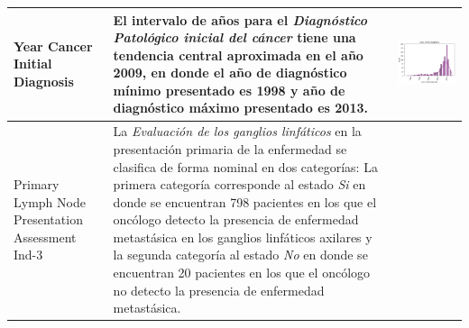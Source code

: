 \begin{table}[!htb]
	\footnotesize
	\begin{threeparttable}
		\begin{tabular}{p{2.5cm} p{7cm} p{6.5cm}} \toprule
		
			Year Cancer Initial Diagnosis
			& El intervalo de años para el \textit{Diagnóstico Patológico inicial del cáncer} tiene una tendencia central aproximada en el año 2009, en donde el año de diagnóstico mínimo presentado es 1998 y año de diagnóstico máximo presentado es 2013.
			
			& \begin{center}\includegraphics[width=1\linewidth]{NOTEBOOK/IMAGENES_DESCRIPTIVAS/21_year_initial_diagnosis}\end{center}
			\\ \hline
			
			Primary Lymph Node Presentation Assessment Ind-3
			& La \textit{Evaluación de los ganglios linfáticos} en la presentación primaria de la enfermedad se clasifica de forma nominal en dos categorías: La primera categoría corresponde al estado \textit{Si} en donde se encuentran 798 pacientes en los que el oncólogo detecto la presencia de enfermedad metastásica en los ganglios linfáticos axilares y la segunda categoría al estado \textit{No} en donde se encuentran 20 pacientes en los que el oncólogo no detecto la presencia de enfermedad metastásica.
			

\end{tabular}
\end{threeparttable}
\end{table}
